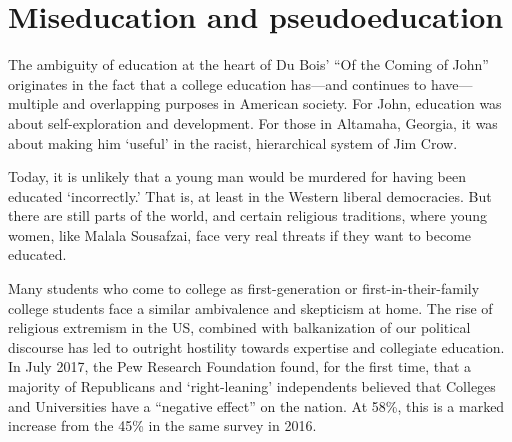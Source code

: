 \chapter{Miseducation and pseudoeducation}
\label{miseducationandpseudoeducation}

The ambiguity of education at the heart of Du Bois' ``Of the Coming of John'' originates in the fact that a college education has---and continues to have---multiple and overlapping purposes in American society. For John, education was about self-exploration and development. For those in Altamaha, Georgia, it was about making him `useful' in the racist, hierarchical system of Jim Crow.

Today, it is unlikely that a young man would be murdered for having been educated `incorrectly.' That is, at least in the Western liberal democracies. But there are still parts of the world, and certain religious traditions, where young women, like Malala Sousafzai, face very real threats if they want to become educated. 

Many students who come to college as first-generation or first-in-their-family college students face a similar ambivalence and skepticism at home. The rise of religious extremism in the US, combined with balkanization of our political discourse has led to outright hostility towards expertise and collegiate education. In July 2017, the Pew Research Foundation found, for the first time, that a majority of Republicans and `right-leaning' independents believed that Colleges and Universities have a ``negative effect'' on the nation. At 58\%, this is a marked increase from the 45\% in the same survey in 2016. ~\citep{PewResearchCenter:2017uj}

